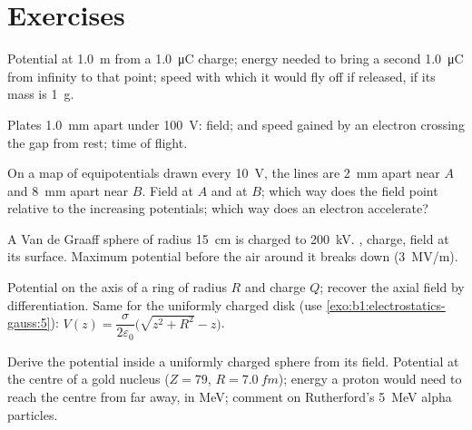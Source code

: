 \section{Exercises}

\begin{exercise}[$\star$]\label{exo:b1:potential-capacitors:1}
Potential at \qty{1.0}{m} from a \qty{1.0}{\micro C} charge; energy needed
to bring a second \qty{1.0}{\micro C} from infinity to that point; speed
with which it would fly off if released, if its mass is \qty{1}{g}.
\end{exercise}

\begin{exercise}[$\star$]\label{exo:b1:potential-capacitors:2}
Plates \qty{1.0}{mm} apart under \qty{100}{V}: field;  and
speed gained by an electron crossing the gap from rest; time of
flight.
\end{exercise}

\begin{exercise}[$\star$]\label{exo:b1:potential-capacitors:3}
On a map of equipotentials drawn every \qty{10}{V}, the lines are
\qty{2}{mm} apart near $A$ and \qty{8}{mm} apart near $B$. Field at $A$
and at $B$; which way does the field point relative to the increasing
potentials; which way does an electron accelerate?
\end{exercise}

\begin{exercise}[$\star$]\label{exo:b1:potential-capacitors:4}
A Van de Graaff sphere of radius \qty{15}{cm} is charged to \qty{200}{kV}.
, charge, field at its surface. Maximum potential before
the air around it breaks down (\qty{3}{MV/m}).
\end{exercise}

\begin{exercise}[$\star\star$]\label{exo:b1:potential-capacitors:5}
Potential on the axis of a ring of radius $R$ and charge $Q$; recover
the axial field by differentiation. Same for the uniformly charged disk
(use \cref{exo:b1:electrostatics-gauss:5}): $V(z) = \dfrac{\sigma}{2\varepsilon_0}
\bigl(\sqrt{z^2 + R^2} - z\bigr)$.
\end{exercise}

\begin{exercise}[$\star\star$]\label{exo:b1:potential-capacitors:6}
Derive the potential inside a uniformly charged sphere from its field.
Potential at the centre of a gold nucleus ($Z = 79$, $R = \qty{7.0}{fm}$);
energy a proton would need to reach the centre from far away, in
\unit{MeV}; comment on Rutherford's \qty{5}{MeV} alpha particles.
\end{exercise}

